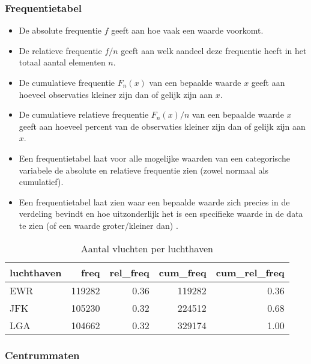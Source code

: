 \documentclass[]{memoir}
\providecommand{\tightlist}{%
  \setlength{\itemsep}{0pt}\setlength{\parskip}{0pt}}
\begin{document}
\hypertarget{frequentietabel}{%
\subsubsection*{Frequentietabel}\label{frequentietabel}}

\begin{itemize}
\tightlist
\item
  De absolute frequentie \(f\) geeft aan hoe vaak een waarde voorkomt.
\item
  De relatieve frequentie \(f/n\) geeft aan welk aandeel deze frequentie heeft in het totaal aantal elementen \(n\).
\item
  De cumulatieve frequentie \(F_n(x)\) van een bepaalde waarde \(x\) geeft aan hoeveel observaties kleiner zijn dan of gelijk zijn aan \(x\).
\item
  De cumulatieve relatieve frequentie \(F_n(x)/n\) van een bepaalde waarde \(x\) geeft aan hoeveel percent van de observaties kleiner zijn dan of gelijk zijn aan \(x\).
\item
  Een frequentietabel laat voor alle mogelijke waarden van een categorische variabele de absolute en relatieve frequentie zien (zowel normaal als cumulatief).
\item
  Een frequentietabel laat zien waar een bepaalde waarde zich precies in de verdeling bevindt en hoe uitzonderlijk het is een specifieke waarde in de data te zien (of een waarde groter/kleiner dan) .
\end{itemize}

\begin{table}[t]

\caption{\label{tab:4-4}Aantal vluchten per luchthaven}
\centering
\fontsize{10}{12}\selectfont
\begin{tabular}{lrrrr}
\toprule
luchthaven & freq & rel\_freq & cum\_freq & cum\_rel\_freq\\
\midrule
EWR & 119282 & 0.36 & 119282 & 0.36\\
JFK & 105230 & 0.32 & 224512 & 0.68\\
LGA & 104662 & 0.32 & 329174 & 1.00\\
\bottomrule
\end{tabular}
\end{table}

\hypertarget{centrummaten}{%
\subsubsection*{Centrummaten}\label{centrummaten}}
\end{document}
